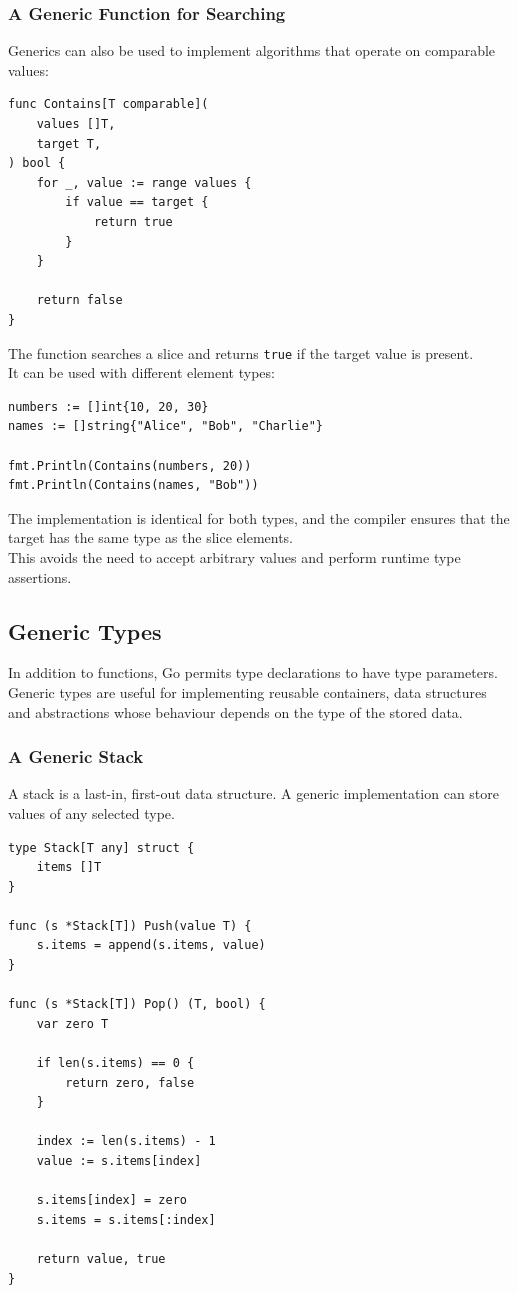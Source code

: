 \subsubsection{A Generic Function for Searching}

Generics can also be used to implement algorithms that operate on comparable values:

\begin{lstlisting}
func Contains[T comparable](
    values []T,
    target T,
) bool {
    for _, value := range values {
        if value == target {
            return true
        }
    }

    return false
}
\end{lstlisting}

The function searches a slice and returns \texttt{true} if the target value is present.\\

It can be used with different element types:

\begin{lstlisting}
numbers := []int{10, 20, 30}
names := []string{"Alice", "Bob", "Charlie"}

fmt.Println(Contains(numbers, 20))
fmt.Println(Contains(names, "Bob"))
\end{lstlisting}

The implementation is identical for both types, and the compiler ensures that the target has the same type as the slice elements.\\

This avoids the need to accept arbitrary values and perform runtime type assertions.

\subsection{Generic Types}

In addition to functions, Go permits type declarations to have type parameters. Generic types are useful for implementing reusable containers, data structures and abstractions whose behaviour depends on the type of the stored data.

\subsubsection{A Generic Stack}

A stack is a last-in, first-out data structure. A generic implementation can store values of any selected type.

\begin{lstlisting}
type Stack[T any] struct {
    items []T
}

func (s *Stack[T]) Push(value T) {
    s.items = append(s.items, value)
}

func (s *Stack[T]) Pop() (T, bool) {
    var zero T

    if len(s.items) == 0 {
        return zero, false
    }

    index := len(s.items) - 1
    value := s.items[index]

    s.items[index] = zero
    s.items = s.items[:index]

    return value, true
}
\end{lstlisting}


